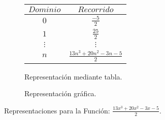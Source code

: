 \begin{figure}[h]
\centering
\begin{subfigure}[A]{0.3\textwidth}
\centering
\begin{tabular}{c|c}
$Dominio$ & $Recorrido$ \\ \hline
\hline
$0$ & $\frac{-5}{2}$ \\ \hline
$1$ & $\frac{25}{2}$ \\ \hline
$\vdots$ & $\vdots$ \\ \hline
$n$& $\frac{13 n^3 + 20 n^2 -3 n -5}{2}$ \\ \hline
\end{tabular} 
\caption{Representación mediante tabla.}

\end{subfigure}%
\quad
\begin{subfigure}[B]{0.3\textwidth}
\centering



\caption{Representación gráfica.}

\end{subfigure}

\caption{Representaciones para la Función: $\frac{13 x^3 + 20 x^2 -3 x -5}{2}$.}

\end{figure}

